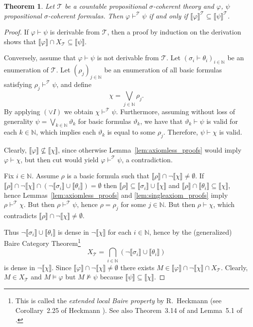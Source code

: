 \documentclass{article}
\theoremstyle{plain}
\newtheorem{theorem}[Theorem]{Theorem}
\def\cal#1{{\mathcal #1}}
\def\IN{{\mathbb N}}
\def\calT{{\cal T}}
\begin{document}
\begin{theorem}\label{thrm:prop_complete}
Let $\calT$ be a countable propositional $\sigma$-coherent theory and $\varphi$, $\psi$ propositional $\sigma$-coherent formulas. Then $\varphi \vdash^{\calT}\psi$ if and only if $\llbracket \varphi\rrbracket^\calT \subseteq \llbracket \psi\rrbracket^\calT$.
\end{theorem}
\begin{proof}
If $\varphi \vdash\psi$ is derivable from $\calT$, then a proof by induction on the derivation shows that $\llbracket\varphi\rrbracket\cap X_\calT \subseteq \llbracket\psi\rrbracket$.


Conversely, assume that $\varphi \vdash\psi$ is not derivable from $\calT$. Let $(\sigma_i \vdash \theta_i)_{i\in\IN}$ be an enumeration of $\calT$. Let $(\rho_j)_{j\in\IN}$ be an enumeration of all basic formulas satisfying $\rho_j \vdash^{\calT} \psi$, and define
\[ \chi = \bigvee_{j\in\IN} \rho_j.\]
By applying $(\vee I)$ we obtain $\chi \vdash^{\calT} \psi$. Furthermore, assuming without loss of generality $\psi = \bigvee_{k\in\IN} \vartheta_k$ for basic formulas $\vartheta_k$, we have that $\vartheta_k \vdash \psi$ is valid for each $k\in\IN$, which implies each $\vartheta_k$ is equal to some $\rho_j$. Therefore, $\psi \vdash \chi$ is valid.

Clearly, $\llbracket\varphi\rrbracket\not\subseteq \llbracket\chi\rrbracket$, since otherwise Lemma~\ref{lem:axiomless_proofs} would imply $\varphi\vdash\chi$, but then cut would yield $\varphi\vdash^{\calT} \psi$, a contradiction.

Fix $i\in\IN$. Assume $\rho$ is a basic formula such that $\llbracket\rho\rrbracket\cap\neg\llbracket\chi\rrbracket\not=\emptyset$. If $\llbracket\rho\rrbracket\cap\neg \llbracket\chi\rrbracket \cap (\neg\llbracket\sigma_i\rrbracket\cup\llbracket\theta_i\rrbracket)=\emptyset$ then $\llbracket\rho\rrbracket\subseteq \llbracket\sigma_i\rrbracket\cup \llbracket\chi\rrbracket$ and $\llbracket\rho\rrbracket\cap \llbracket\theta_i\rrbracket \subseteq \llbracket\chi\rrbracket$, hence Lemmas~\ref{lem:axiomless_proofs} and \ref{lem:singleaxiom_proofs} imply $\rho\vdash^{\calT} \chi$. But then $\rho\vdash^{\calT} \psi$, hence $\rho = \rho_j$ for some $j\in\IN$. But then $\rho\vdash \chi$, which contradicts $\llbracket\rho\rrbracket\cap\neg\llbracket\chi\rrbracket\not=\emptyset$.

Thus $\neg\llbracket\sigma_i\rrbracket\cup\llbracket\theta_i\rrbracket$ is dense in $\neg\llbracket\chi\rrbracket$ for each $i\in\IN$, hence by the (generalized) Baire Category Theorem\footnote{This is called the \emph{extended local Baire property} by R.~Heckmann (see Corollary~2.25 of Heckmann \cite{H15}). See also Theorem~3.14 of \cite{BG15} and Lemma~5.1 of \cite{d1?}.}
\[X_\calT = \bigcap_{i\in\IN} (\neg\llbracket\sigma_i\rrbracket\cup\llbracket\theta_i\rrbracket)\]
is dense in $\neg\llbracket\chi\rrbracket$. Since $\llbracket\varphi\rrbracket\cap\neg\llbracket\chi\rrbracket\not=\emptyset$ there exists $M\in \llbracket\varphi\rrbracket\cap\neg\llbracket\chi\rrbracket\cap X_\calT$. Clearly, $M\in X_\calT$ and $M\vDash \varphi$ but $M\not\vDash\psi$ because  $\llbracket \psi\rrbracket \subseteq \llbracket \chi\rrbracket$.
\end{proof}
\end{document}
